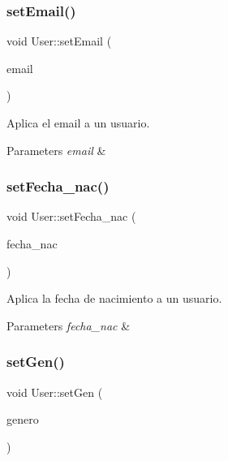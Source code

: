 \subsubsection{\texorpdfstring{set\+Email()}{setEmail()}}
{\footnotesize\ttfamily void User\+::set\+Email (\begin{DoxyParamCaption}\item[{Q\+String}]{email }\end{DoxyParamCaption})}



Aplica el email a un usuario. 


\begin{DoxyParams}{Parameters}
{\em email} & \\
\hline
\end{DoxyParams}
\mbox{\label{classUser_a09f782800ba5217b98f0d20fc1010ca0}} 
\subsubsection{\texorpdfstring{set\+Fecha\+\_\+nac()}{setFecha\_nac()}}
{\footnotesize\ttfamily void User\+::set\+Fecha\+\_\+nac (\begin{DoxyParamCaption}\item[{Q\+String}]{fecha\+\_\+nac }\end{DoxyParamCaption})}



Aplica la fecha de nacimiento a un usuario. 


\begin{DoxyParams}{Parameters}
{\em fecha\+\_\+nac} & \\
\hline
\end{DoxyParams}
\mbox{\label{classUser_a23659aed8f058b19a148449c77a5509e}} 
\subsubsection{\texorpdfstring{set\+Gen()}{setGen()}}
{\footnotesize\ttfamily void User\+::set\+Gen (\begin{DoxyParamCaption}\item[{Q\+String}]{genero }\end{DoxyParamCaption})}



